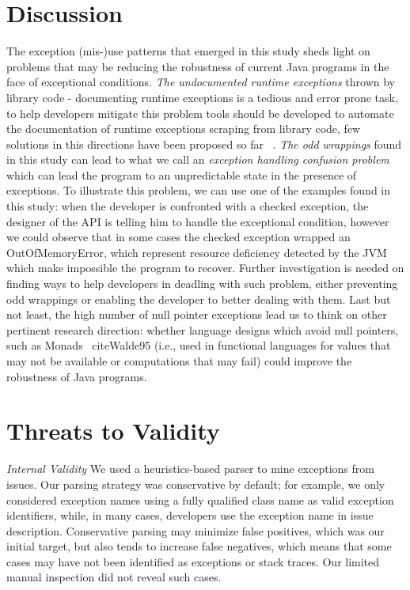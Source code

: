 \documentclass[conference]{IEEEtran}
\begin{document}
\section{Discussion}

The exception (mis-)use patterns that emerged  in this study sheds light on 
problems that may be reducing the robustness of current Java programs in the face of
exceptional conditions. \noindent\emph{The undocumented runtime exceptions} thrown by library code -
documenting runtime exceptions is a tedious and error prone task, to help developers
mitigate this problem tools should be developed to automate the documentation of runtime exceptions
scraping from library code, few solutions in this directions have been proposed so far ~\cite{van2005combining}. 
 \noindent\emph{The odd wrappings}  found in this study can lead to what we call
an \emph{exception handling confusion problem} which can lead the program to
an unpredictable state in the presence of exceptions. To illustrate this problem, we can use
 one of the examples found in this study: when the developer is 
confronted with a checked exception, the designer of the API is telling him 
to handle the exceptional condition, however we could observe that in some cases the 
checked exception wrapped an OutOfMemoryError, which represent resource deficiency detected 
by the JVM which make impossible the program to recover. Further investigation is needed on finding 
ways to help developers in deadling with such problem, either preventing odd wrappings or enabling 
the developer to better dealing with them. Last but not least, the high number of null pointer exceptions 
lead us to think on other pertinent research direction: whether language designs which avoid null pointers, 
such as Monads ~cite{Walde95} (i.e., used in functional languages for values that may not be available 
or computations that may fail) could improve the robustness of Java programs. 

\section{Threats to Validity}

\noindent\emph{Internal Validity} We used a heuristics-based parser to mine
exceptions from issues.  Our parsing strategy was conservative by default; for
example, we only considered exception names using a fully qualified class name
as valid exception identifiers, while, in many cases, developers use the
exception name in issue description. Conservative parsing may minimize false
positives, which was our initial target, but also tends to increase false
negatives, which means that some cases may have not been identified as
exceptions or stack traces. Our limited manual inspection did not reveal such
cases.
\end{document}
